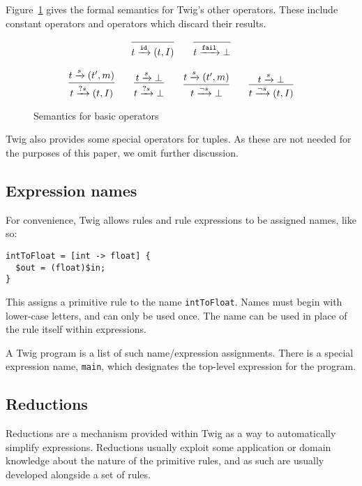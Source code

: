 Figure~\ref{semantics:basic} gives the formal semantics for Twig's other
operators. These include constant operators and operators which discard their
results.

\begin{figure}[ht]
\label{semantics:basic}
\[
\infer{t \arr{\mathtt{id}} (t,I)}{}
\qquad
\infer{t \arr{\mathtt{fail}} \bot}{}
\]

\[
\infer{t \arr{?s} (t,I)}{t \arr{s} (t',m)}
\qquad 
\infer{t \arr{?s} \bot}{t \arr{s} \bot}
\qquad
\infer{t \arr{\lnot s} \bot}{t \arr{s} (t',m)}
\qquad 
\infer{t \arr{\lnot s} (t,I)}{t \arr{s} \bot}
\]

\caption{Semantics for basic operators}
\end{figure}

Twig also provides some special operators for tuples. As these are not needed
for the purposes of this paper, we omit further discussion.

\subsection{Expression names}
\label{section:names}

For convenience, Twig allows rules and rule expressions to be assigned names,
like so:

\begin{verbatim}
intToFloat = [int -> float] {
  $out = (float)$in;
}
\end{verbatim}

This assigns a primitive rule to the name \texttt{intToFloat}. Names must begin
with lower-case letters, and can only be used once. The name can be used in
place of the rule itself within expressions.

A Twig program is a list of such name/expression assignments. There is a
special expression name, \texttt{main}, which designates the top-level
expression for the program.

\subsection{Reductions}

Reductions are a mechanism provided within Twig as a way to automatically
simplify expressions. Reductions usually exploit some application or domain
knowledge about the nature of the primitive rules, and as such are usually
developed alongside a set of rules.

